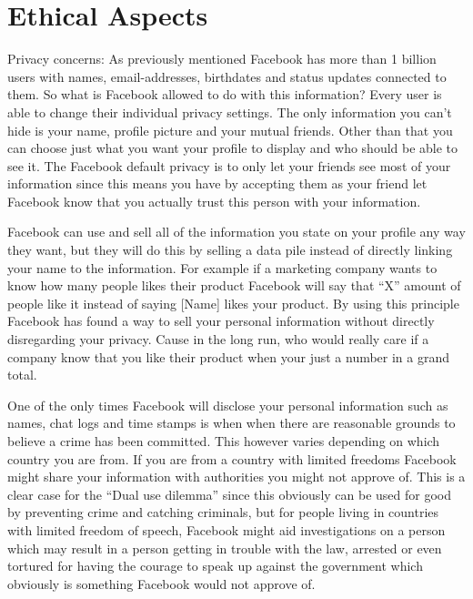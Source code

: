 \documentclass[conference]{IEEEtran}
\begin{document}
\section{Ethical Aspects}
\label{ethics} 

Privacy concerns: As previously mentioned Facebook has more than
1 billion users with names, email-addresses, birthdates and status updates
connected to them. So what is Facebook allowed to do with this information?
Every user is able to change their individual privacy settings. The only
information you can’t hide is your name, profile picture and your mutual
friends. Other than that you can choose just what you want your profile to
display and who should be able to see it. The Facebook default privacy is to
only let your friends see most of your information since this means you have by
accepting them as your friend let Facebook know that you actually trust this
person with your information. 

Facebook can use and sell all of the information you state on your profile any
way they want, but they will do this by selling a data pile instead of directly
linking your name to the information. For example if a marketing company wants
to know how many people likes their product Facebook will say that “X” amount
of people like it instead of saying [Name] likes your product. By using this
principle Facebook has found a way to sell your personal information without
directly disregarding your privacy. Cause in the long run, who would really
care if a company know that you like their product when your just a number in a
grand total.

One of the only times Facebook will disclose your personal information such as
names, chat logs and time stamps is when when there are reasonable grounds to
believe a crime has been committed. This however varies depending on which
country you are from. If you are from a country with limited freedoms Facebook
might share your information with authorities you might not approve of. This is
a clear case for the “Dual use dilemma” since this obviously can be used for
good by preventing crime and catching criminals, but for people living in
countries with limited freedom of speech, Facebook might aid investigations on
a person which may result in a person getting in trouble with the law, arrested
or even tortured for having the courage to speak up against the government
which obviously is something Facebook would not approve of.
\end{document}
